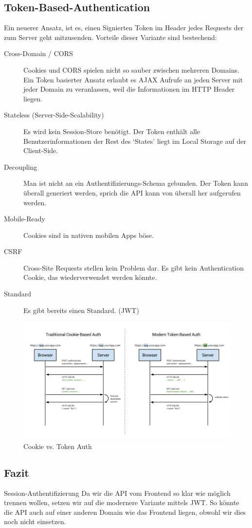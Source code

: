 \subsection{Token-Based-Authentication}
Ein neuerer Ansatz, ist es, einen Signierten Token im Header jedes Requests der zum Server geht mitzusenden. Vorteile dieser Variante sind bestechend:
\begin{description}
  \item[Cross-Domain / CORS]
  Cookies und CORS spielen nicht so sauber zwischen mehreren Domains. Ein Token basierter Ansatz erlaubt es AJAX Aufrufe an jeden Server mit jeder Domain zu veranlassen, weil die Informationen im HTTP Header liegen.
  \item[Stateless (Server-Side-Scalability)]Es wird kein Session-Store benötigt. Der Token enthält alle Benutzerinformationen der Rest des `States' liegt im Local Storage auf der Client-Side.
  \item[Decoupling] Man ist nicht an ein Authentifizierungs-Schema gebunden. Der Token kann überall generiert werden, sprich die API kann von überall her aufgerufen werden.
  \item[Mobile-Ready]Cookies sind in nativen mobilen Apps böse.
  \item[CSRF]Cross-Site Requests stellen kein Problem dar. Es gibt kein Authentication Cookie, das wiederverwendet werden könnte.
  \item[Standard]Es gibt bereits einen Standard. (\gls{JWT})
\end{description}
\begin{figure}[H]
    \centering
    \includegraphics[width=\linewidth]{fig/cookie-token-auth}
    \caption{Cookie vs. Token Auth}
    \label{fig:pd:cookie-token-auth}
\end{figure}
\subsection{Fazit}
\begin{decision}{Session-Authentifizierung}
Da wir die API vom Frontend so klar wie möglich trennen wollen, setzen wir auf die modernere Variante mittels \acs{JWT}. So könnte die API auch auf einer anderen Domain wie das Frontend liegen, obwohl wir dies noch nicht einsetzen.
\end{decision}
